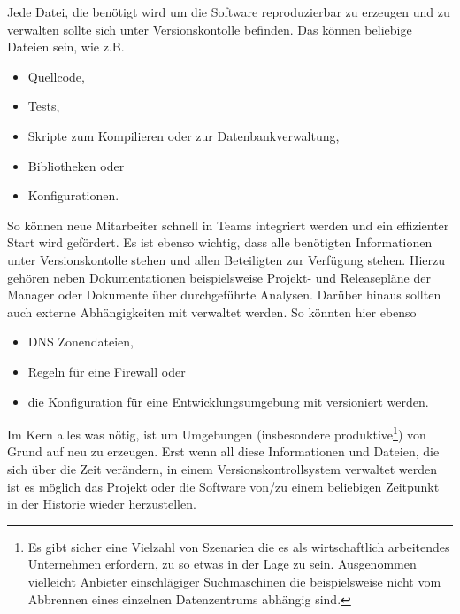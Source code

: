Jede Datei, die benötigt wird um die Software reproduzierbar zu erzeugen und zu
verwalten sollte sich unter Versionskontolle befinden. Das können beliebige
Dateien sein, wie z.B.

\begin{itemize}
\item Quellcode,
\item Tests,
\item Skripte zum Kompilieren oder zur Datenbankverwaltung,
\item Bibliotheken oder
\item Konfigurationen.
\end{itemize}

So können neue Mitarbeiter schnell in Teams integriert werden und ein
effizienter Start wird gefördert. Es ist ebenso wichtig, dass alle benötigten
Informationen unter Versionskontolle stehen und allen Beteiligten zur Verfügung
stehen. Hierzu gehören neben Dokumentationen beispielsweise Projekt- und
Releasepläne der Manager oder Dokumente über durchgeführte Analysen. Darüber
hinaus sollten auch externe Abhängigkeiten mit verwaltet werden. So könnten
hier ebenso

\begin{itemize}
\item DNS Zonendateien,
\item Regeln für eine Firewall oder
\item die Konfiguration für eine Entwicklungsumgebung mit versioniert werden.
\end{itemize}

Im Kern alles was nötig, ist um Umgebungen (insbesondere produktive\footnote{Es
gibt sicher eine Vielzahl von Szenarien die es als wirtschaftlich arbeitendes
Unternehmen erfordern, zu so etwas in der Lage zu sein. Ausgenommen vielleicht
Anbieter einschlägiger Suchmaschinen die beispielsweise nicht vom Abbrennen
eines einzelnen Datenzentrums abhängig sind.}) von Grund auf neu zu erzeugen.
Erst wenn all diese Informationen und Dateien, die sich über die Zeit
verändern, in einem Versionskontrollsystem verwaltet werden ist es möglich das
Projekt oder die Software von/zu einem beliebigen Zeitpunkt in der Historie
wieder herzustellen.\cite[S.~33]{cd}

